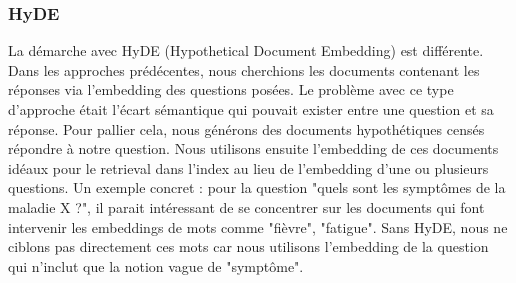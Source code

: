 \subsubsection{HyDE}
 La démarche avec HyDE \cite{Jostmann2024} (Hypothetical Document Embedding) est différente. Dans les approches prédécentes, nous cherchions les documents contenant les réponses via l'embedding des questions posées. Le problème avec ce type d'approche était l'écart sémantique qui pouvait exister entre une question et sa réponse. Pour pallier cela, nous générons des documents hypothétiques censés répondre à notre question. Nous utilisons ensuite l'embedding de ces documents idéaux pour le retrieval dans l'index au lieu de l'embedding d'une ou plusieurs questions.
 Un exemple concret : pour la question "quels sont les symptômes de la maladie X ?", il parait intéressant de se concentrer sur les documents qui font intervenir les embeddings de mots comme "fièvre", "fatigue". Sans HyDE, nous ne ciblons pas directement ces mots car nous utilisons l'embedding de la question qui n'inclut que la notion vague de "symptôme".